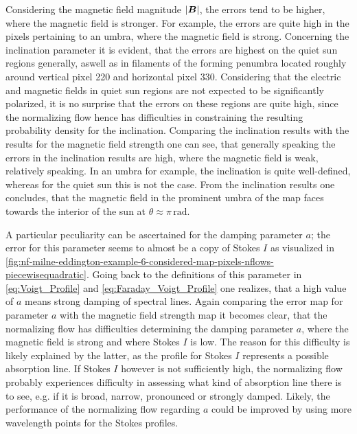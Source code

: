 \documentclass[a4paper,12pt]{report}
\begin{document}
Considering the magnetic field magnitude $|\bm{B}|$, the errors tend to be higher, where the magnetic field is stronger. For example, the errors are quite high in the pixels pertaining to an umbra, where the magnetic field is strong. Concerning the inclination parameter it is evident, that the errors are highest on the quiet sun regions generally, aswell as in filaments of the forming penumbra located roughly around vertical pixel 220 and horizontal pixel 330. Considering that the electric and magnetic fields in quiet sun regions are not expected to be significantly polarized, it is no surprise that the errors on these regions are quite high, since the normalizing flow hence has difficulties in constraining the resulting probability density for the inclination. Comparing the inclination results with the results for the magnetic field strength one can see, that generally speaking the errors in the inclination results are high, where the magnetic field is weak, relatively speaking. In an umbra for example, the inclination is quite well-defined, whereas for the quiet sun this is not the case. From the inclination results one concludes, that the magnetic field in the prominent umbra of the map faces towards the interior of the sun at $\theta \approx \pi\,\si{\radian}$. 

A particular peculiarity can be ascertained for the damping parameter $a$; the error for this parameter seems to almost be a copy of Stokes $I$ as visualized in \cref{fig:nf-milne-eddington-example-6-considered-map-pixels-nflows-piecewisequadratic}. Going back to the definitions of this parameter in \cref{eq:Voigt_Profile} and \cref{eq:Faraday_Voigt_Profile} one realizes, that a high value of $a$ means strong damping of spectral lines. Again comparing the error map for parameter $a$ with the magnetic field strength map it becomes clear, that the normalizing flow has difficulties determining the damping parameter $a$, where the magnetic field is strong and where Stokes $I$ is low. The reason for this difficulty is likely explained by the latter, as the profile for Stokes $I$ represents a possible absorption line. If Stokes $I$ however is not sufficiently high, the normalizing flow probably experiences difficulty in assessing what kind of absorption line there is to see, e.g. if it is broad, narrow, pronounced or strongly damped. Likely, the performance of the normalizing flow regarding $a$ could be improved by using more wavelength points for the Stokes profiles.
\end{document}
